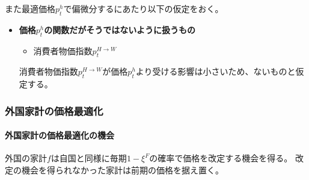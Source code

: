 また最適価格\(p_t^h\)で偏微分するにあたり以下の仮定をおく。
\begin{itemize}
    \item
    \label{itm:chapter3_assumptions_price_optimization_home_caliculation_assumption}
        \textbf{価格\(p_t^h\)の関数だがそうではないように扱うもの}
        \begin{itemize}
            \item 消費者物価指数\(p_t^{H\to W}\)
        \end{itemize}
        消費者物価指数\(p_t^{H\to W}\)が価格\(p_t^h\)より受ける影響は小さいため、ないものと仮定する。
\end{itemize}

\subsubsection{外国家計の価格最適化}
\label{sec:chapter3_assumptions_price_optimization_foreign}

\paragraph{外国家計の価格最適化の機会}
\label{sec:chapter3_assumptions_price_optimization_foreign_opportunity}
外国の家計\(f\)は自国と同様に毎期\(1-\xi^F\)の確率で価格を改定する機会を得る。
改定の機会を得られなかった家計は前期の価格を据え置く。

